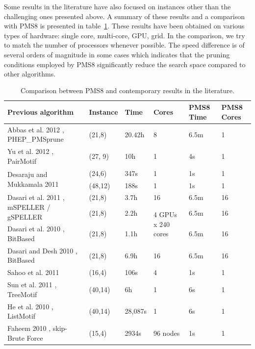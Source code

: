 Some results in the literature have also focused on instances other than
the challenging ones presented above. A summary of these results and a comparison
with PMS8 is presented in table~\ref{pms8_table_comparison}. These results have been obtained on various types of hardware: single core,
multi-core, GPU, grid. In the comparison, we try to match the number of processors whenever possible.
The speed difference is of several orders of magnitude in some cases which indicates that
the pruning conditions employed by PMS8 significantly reduce the
search space compared to other algorithms.


\begin{table}

\caption{Comparison between PMS8 and contemporary
results in the literature.}\label{pms8_table_comparison}
\begin{tabular}{| p{2.5in} | p{0.5in} | p{0.5in} | p{0.6in} | p{0.4in} | p{0.4in} |}
\hline
Previous algorithm & Instance & Time & Cores & PMS8 Time & PMS8 Cores\\
\hline
Abbas et al. 2012 \cite{AAB12},  PHEP\_PMSprune & (21,8) & 20.42h & 8 & 6.5m & 1 \\
\hline
Yu et al. 2012 \cite{YHZG12}, PairMotif & (27, 9) & 10h & 1 & 4s & 1\\
\hline
\multirow{2}{*}{Desaraju and Mukkamala 2011 \cite{DeM11}} & (24,6) & 347s & 1 & 1s & 1\\
\cline{2-6}
                                         & (48,12)& 188s & 1 & 1s & 1\\
\hline
\multirow{2}{*}{\vbox{Dasari et al. 2011 \cite{DRZ11}, mSPELLER / gSPELLER}} & (21,8) & 3.7h & 16 & 6.5m & 16\\
\cline{2-6}
                                                   & (21,8) & 2.2h & \multirow{2}{*}{\vbox{4 GPUs x 240 cores}} & 6.5m & 16\\
\cline{1-3}\cline{5-6}
Dasari et al. 2010 \cite{DDZ10}, BitBased & (21,8) & 1.1h & & 6.5m & 16\\
\hline
Dasari and Desh 2010 \cite{DD10}, BitBased & (21,8) & 6.9h & 16 & 6.5m & 16\\
\hline
Sahoo et al. 2011 \cite{SSRP11} & (16,4) & 106s & 4 & 1s & 1\\
\hline
Sun et al. 2011 \cite{SLHTR11}, TreeMotif &(40,14) & 6h & 1 & 6s & 1\\
\hline
He et al. 2010 \cite{HLWR10}, ListMotif & (40,14) & 28,087s & 1 & 6s &1\\
\hline
Faheem 2010 \cite{Fah10}, skip-Brute Force & (15,4) & 2934s & 96 nodes & 1s & 1\\

\end{tabular}
\end{table}
